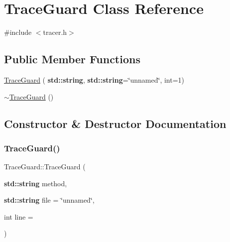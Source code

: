 \hypertarget{class_trace_guard}{}\section{Trace\+Guard Class Reference}
\label{class_trace_guard}


{\ttfamily \#include $<$tracer.\+h$>$}

\subsection*{Public Member Functions}
\begin{DoxyCompactItemize}
\item 
\hyperlink{class_trace_guard_a25457fa2136d34439f3572d8e497f7a3}{Trace\+Guard} (\textbf{ std\+::string}, \textbf{ std\+::string}=\char`\"{}unnamed\char`\"{}, int=1)
\item 
\hyperlink{class_trace_guard_ade02f16dafa92b8835808f1403c730ca}{$\sim$\+Trace\+Guard} ()
\end{DoxyCompactItemize}


\subsection{Constructor \& Destructor Documentation}
\mbox{\label{class_trace_guard_a25457fa2136d34439f3572d8e497f7a3}} 
\subsubsection{\texorpdfstring{Trace\+Guard()}{TraceGuard()}}
{\footnotesize\ttfamily Trace\+Guard\+::\+Trace\+Guard (\begin{DoxyParamCaption}\item[{\textbf{ std\+::string}}]{method,  }\item[{\textbf{ std\+::string}}]{file = {\ttfamily \char`\"{}unnamed\char`\"{}},  }\item[{int}]{line = {} }\end{DoxyParamCaption})}

\mbox{\label{class_trace_guard_ade02f16dafa92b8835808f1403c730ca}} 
